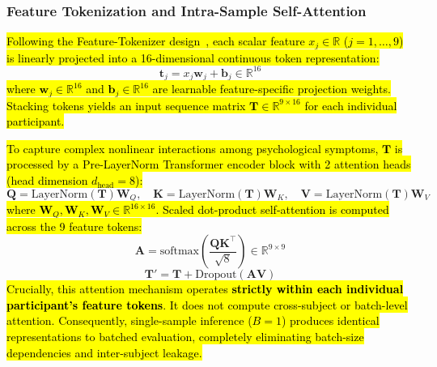 \documentclass[10pt,letterpaper]{article}
\begin{document}
        \subsubsection*{\textbf{Feature Tokenization and Intra-Sample Self-Attention}}
        \hl{Following the Feature-Tokenizer design~\cite{ref_fttransformer}, each scalar feature $x_j \in \mathbb{R}$ ($j=1, \dots, 9$) is linearly projected into a 16-dimensional continuous token representation:}
        \begin{equation} \label{eq:tokenization}
        \mathbf{t}_j = x_j \mathbf{w}_j + \mathbf{b}_j \in \mathbb{R}^{16}
        \end{equation}
        \hl{where $\mathbf{w}_j \in \mathbb{R}^{16}$ and $\mathbf{b}_j \in \mathbb{R}^{16}$ are learnable feature-specific projection weights. Stacking tokens yields an input sequence matrix $\mathbf{T} \in \mathbb{R}^{9 \times 16}$ for each individual participant.}

        \hl{To capture complex nonlinear interactions among psychological symptoms, $\mathbf{T}$ is processed by a Pre-LayerNorm Transformer encoder block with 2 attention heads (head dimension $d_{\text{head}} = 8$):}
        \begin{equation} \label{eq:qkv_proj}
        \mathbf{Q} = \text{LayerNorm}(\mathbf{T})\mathbf{W}_Q,\quad \mathbf{K} = \text{LayerNorm}(\mathbf{T})\mathbf{W}_K,\quad \mathbf{V} = \text{LayerNorm}(\mathbf{T})\mathbf{W}_V
        \end{equation}
        \hl{where $\mathbf{W}_Q, \mathbf{W}_K, \mathbf{W}_V \in \mathbb{R}^{16 \times 16}$. Scaled dot-product self-attention is computed across the 9 feature tokens:}
        \begin{equation} \label{eq:attn_weights}
        \mathbf{A} = \text{softmax}\left(\frac{\mathbf{Q}\mathbf{K}^\top}{\sqrt{8}}\right) \in \mathbb{R}^{9 \times 9}
        \end{equation}
        \begin{equation} \label{eq:attn_out}
        \mathbf{T}' = \mathbf{T} + \text{Dropout}(\mathbf{A}\mathbf{V})
        \end{equation}
        \hl{Crucially, this attention mechanism operates \textbf{strictly within each individual participant's feature tokens}. It does not compute cross-subject or batch-level attention. Consequently, single-sample inference ($B=1$) produces identical representations to batched evaluation, completely eliminating batch-size dependencies and inter-subject leakage.}
\end{document}
